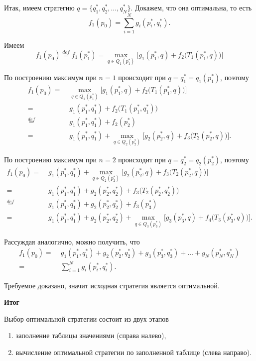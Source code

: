Итак, имеем стратегию $q = \{q_1^*, q_2^*, \dots, q_N^*\}$. Докажем, что она оптимальна, то есть
\[
f_1(p_0) = \sum_{i=1}^N g_i(p_i^*, q_i^*).
\]

Имеем
\[
f_1(p_0) \stackrel{def}{=} f_1(p_1^*) = \max_{q \in Q_{1}(p_1^*)} \Big[g_1(p_1^*, q) + f_{2}\big(T_{1}(p_1^*, q)\big)\Big]
\]

По построению максимум при $n=1$ происходит при $q = q_1^* = q_1(p_1^*)$, поэтому
\begin{align*}
	f_1(p_0) =& \; \max_{q \in Q_{1}(p_1^*)} \Big[g_1(p_1^*, q) + f_{2}\big(T_{1}(p_1^*, q)\big)\Big] \\
	=& \; g_1(p_1^*, q_1^*) + f_{2}\big(T_{1}(p_1^*, q_1^*)\big) \\
	\stackrel{def}{=}& \; g_1(p_1^*, q_1^*) + f_2(p_2^*) \\
	=& \; g_1(p_1^*, q_1^*) + \max_{q \in Q_{2}(p_2^*)} \Big[g_2(p_2^*, q) + f_{3}\big(T_{2}(p_2^*, q)\big)\Big].
\end{align*}

По построению максимум при $n=2$ происходит при $q = q_2^* = q_2(p_2^*)$, поэтому
\begin{align*}
	f_1(p_0) =& \; g_1(p_1^*, q_1^*) + \max_{q \in Q_{2}(p_2^*)} \Big[g_2(p_2^*, q) + f_{3}\big(T_{2}(p_2^*, q)\big)\Big] \\
	=& \; g_1(p_1^*, q_1^*) + g_2(p_2^*, q_2^*) + f_{3}\big(T_{2}(p_2^*, q_2^*)\big) \\
	\stackrel{def}{=}& \; g_1(p_1^*, q_1^*) + g_2(p_2^*, q_2^*) + f_3(p_3^*) \\
	=& \; g_1(p_1^*, q_1^*) + g_2(p_2^*, q_2^*) + \max_{q \in Q_{3}(p_3^*)} \Big[g_3(p_3^*, q) + f_{4}\big(T_{3}(p_3^*, q)\big)\Big].
\end{align*}

Рассуждая аналогично, можно получить, что
\begin{align*}
	f_1(p_0) =& \; g_1(p_1^*, q_1^*) + g_2(p_2^*, q_2^*) + g_3(p_3^*, q_3^*) + \dots + g_N(p_N^*, q_N^*) \\
	=& \; \sum_{i=1}^N g_i(p_i^*, q_i^*).
\end{align*}

Требуемое доказано, значит исходная стратегия является оптимальной.

\bigskip

\textbf{Итог}

Выбор оптимальной стратегии состоит из двух этапов
\begin{enumerate}[nosep]
	\item заполнение таблицы значениями (справа налево),
	
	\item вычисление оптимальной стратегии по заполненной таблице (слева направо).
\end{enumerate}

